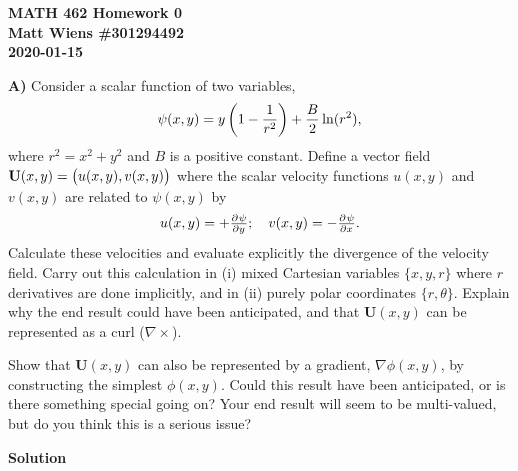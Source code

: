 \documentclass{article}
\def\*#1{\mathbf{#1}}
\begin{document}
\textbf{MATH 462 Homework 0} \\
\textbf{Matt Wiens \#301294492} \\
\textbf{2020-01-15}

\textbf{A)} Consider a scalar function of two variables,
%
\begin{equation*}
    \psi(x, y) = y \del{1 - \frac{1}{r^2}} + \frac{B}{2} \ln(r^2)
    ,
\end{equation*}
%
where $r^2 = x^2 + y^2$ and $B$ is a positive constant. Define a vector
field $\*U(x, y) = \del{u(x, y), v(x, y)}$ where the scalar velocity
functions $u(x, y)$ and $v(x, y)$ are related to $\psi(x, y)$ by
%
\begin{equation*}
    u(x, y) = + \pd{\psi}{y}; \quad v(x, y) = - \pd{\psi}{x}.
\end{equation*}
%
Calculate these velocities and evaluate explicitly the divergence of the
velocity field. Carry out this calculation in (i) mixed Cartesian
variables $\{x, y, r\}$ where $r$ derivatives are done implicitly, and
in (ii) purely polar coordinates $\{r, \theta\}$. Explain why the end
result could have been anticipated, and that $\*U(x, y)$ can be
represented as a curl ($\nabla \times$).


Show that $\*U(x, y)$ can also be represented by a gradient, $\nabla
\phi(x, y)$, by constructing the simplest $\phi(x, y)$. Could this
result have been anticipated, or is there something special going on?
Your end result will seem to be multi-valued, but do you think this is a
serious issue?

\textbf{Solution}
\end{document}
